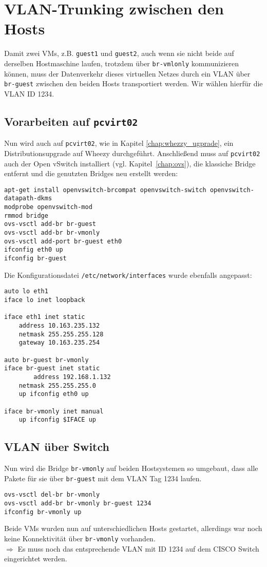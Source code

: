 \chapter{VLAN-Trunking zwischen den Hosts}
\label{vlan_trunk}
Damit zwei VMs, z.B. \verb#guest1# und \verb#guest2#, auch wenn sie nicht beide auf derselben Hostmaschine laufen, trotzdem über \verb#br-vmlonly# kommunizieren können, muss der Datenverkehr dieses virtuellen Netzes durch ein VLAN über \verb#br-guest# zwischen den beiden Hosts transportiert werden. Wir wählen hierfür die VLAN ID 1234.

\section {Vorarbeiten auf  \texttt{pcvirt02}}\label{ovs2}
Nun wird auch auf \verb#pcvirt02#, wie in Kapitel \ref{chap:whezzy_ugprade}, ein Distributionsupgrade auf Wheezy durchgeführt. Anschließend muss auf \verb#pcvirt02#  auch der Open vSwitch installiert (vgl. Kapitel~\ref{chap:ovs}), die klassiche Bridge entfernt und die genutzten Bridges neu erstellt werden:
\begin{verbatim}
apt-get install openvswitch-brcompat openvswitch-switch openvswitch-datapath-dkms
modprobe openvswitch-mod
rmmod bridge
ovs-vsctl add-br br-guest
ovs-vsctl add-br br-vmonly
ovs-vsctl add-port br-guest eth0
ifconfig eth0 up
ifconfig br-guest
\end{verbatim}

Die Konfigurationsdatei \verb#/etc/network/interfaces# wurde ebenfalls angepasst:
\setupVerbatimOut
\begin{verbatim}
auto lo eth1
iface lo inet loopback

iface eth1 inet static
    address 10.163.235.132
	netmask 255.255.255.128
	gateway 10.163.235.254

auto br-guest br-vmonly
iface br-guest inet static
        address 192.168.1.132
	netmask 255.255.255.0
	up ifconfig eth0 up

iface br-vmonly inet manual 
	up ifconfig $IFACE up 
\end{verbatim}

\section{VLAN über Switch}
Nun wird die Bridge \verb#br-vmonly# auf beiden Hostsystemen so umgebaut, dass alle Pakete für sie über \verb#br-guest# mit dem VLAN Tag 1234 laufen.
\setupVerbatimOut
\begin{verbatim}
ovs-vsctl del-br br-vmonly
ovs-vsctl add-br br-vmonly br-guest 1234
ifconfig br-vmonly up
\end{verbatim}
Beide VMs wurden nun auf unterschiedlichen Hosts gestartet, allerdings war noch keine Kon\-nek\-tiv\-ität über \verb#br-vmonly# vorhanden.
\\
$\Rightarrow$ Es muss noch das entsprechende VLAN mit ID 1234 auf dem CISCO Switch eingerichtet werden.

